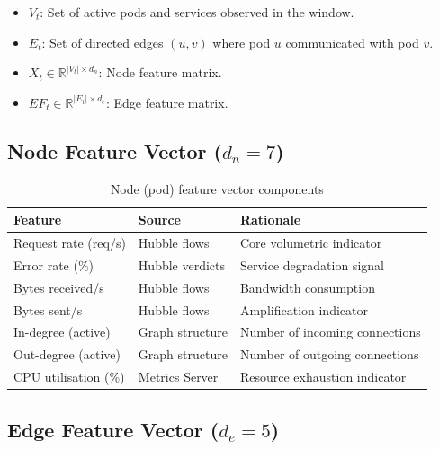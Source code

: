 \begin{itemize}
  \item $V_t$: Set of active pods and services observed in the window.
  \item $E_t$: Set of directed edges $(u, v)$ where pod $u$ communicated with pod $v$.
  \item $X_t \in \mathbb{R}^{|V_t| \times d_n}$: Node feature matrix.
  \item $EF_t \in \mathbb{R}^{|E_t| \times d_e}$: Edge feature matrix.
\end{itemize}

\subsection{Node Feature Vector ($d_n = 7$)}

\begin{table}[H]
\centering
\caption{Node (pod) feature vector components}
\label{tab:node_features}
\begin{tabular}{lll}
\toprule
\textbf{Feature} & \textbf{Source} & \textbf{Rationale} \\
\midrule
Request rate (req/s)        & Hubble flows      & Core volumetric indicator \\
Error rate (\%)             & Hubble verdicts   & Service degradation signal \\
Bytes received/s            & Hubble flows      & Bandwidth consumption \\
Bytes sent/s                & Hubble flows      & Amplification indicator \\
In-degree (active)          & Graph structure   & Number of incoming connections \\
Out-degree (active)         & Graph structure   & Number of outgoing connections \\
CPU utilisation (\%)        & Metrics Server    & Resource exhaustion indicator \\
\bottomrule
\end{tabular}
\end{table}

\subsection{Edge Feature Vector ($d_e = 5$)}

